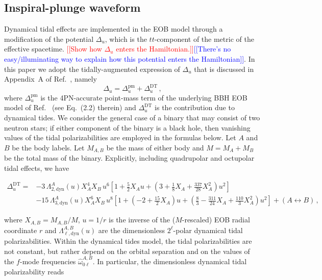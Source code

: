 \documentclass[prd,aps,letter,twocolumn,floatfix,notitlepage,nofootinbib]{revtex4-1}
\newcommand{\red}[1]{\textcolor{red}{#1}}
\newcommand{\blue}[1]{\textcolor{blue}{#1}}
\begin{document}
\subsection{Inspiral-plunge waveform}

Dynamical tidal effects are implemented in the EOB model through a modification of the potential $\Delta_u$, which is the $tt$-component of the metric of the effective spacetime. \red{[[Show how $\Delta_u$ enters the Hamiltonian.]]}\blue{[[There's no easy/illuminating way to explain how this potential enters the Hamiltonian]]}. In this paper we adopt the tidally-augmented expression of $\Delta_u$ that is discussed in Appendix~A of Ref.~\cite{Steinhoff:2016rfi}, namely
\begin{equation}
\Delta_u = \Delta_u^{\textrm{pm}} + \Delta_u^{\textrm{DT}}\,,
\end{equation}
where $\Delta_u^{\textrm{pm}}$ is the 4PN-accurate point-mass term of the underlying BBH EOB model of Ref.~\cite{Bohe:2016gbl} (see Eq.~(2.2) therein) and $\Delta_u^{\textrm{DT}}$ is the contribution due to dynamical tides. We consider the general case of a binary that may consist of two neutron stars; if either component of the binary is a black hole, then vanishing values of the tidal polarizabilities are employed in the formulas below. Let $A$ and $B$ be the body labels. Let $M_{A,B}$ be the mass of either body and $M=M_A+M_B$ be the total mass of the binary.  Explicitly, including quadrupolar and octupolar tidal effects, we have
\begin{widetext}
\begin{align}
 \Delta_u^{\textrm{DT}} =&  - 3\,\Lambda_{2,\textrm{dyn}}^{A}(u)X_A^4 X_B\,u^6  \left[ 1 + \frac{5}{2} X_Au + \left(3 + \frac{1}{8}X_A + \frac{337}{28} X_A^2\right)u^2 \right]\nonumber\\
 &- 15\,\Lambda_{3,\textrm{dyn}}^{A}(u)X_A^6X_B\,u^8 \left[1 + \left(-2 + \frac{15}{2}X_A\right)u + \left(\frac{8}{3} - \frac{311}{24}X_A + \frac{110}{3}X_A^2\right) u^2\right] + (A \leftrightarrow B)\,,
\end{align}
\end{widetext}
where $X_{A,B}=M_{A,B}/M$, $u=1/r$ is the inverse of the ($M$-rescaled) EOB radial coordinate $r$ and $\Lambda_{\ell,\textrm{dyn}}^{A,B}(u)$ are the dimensionless $2^{\ell}$-polar dynamical tidal polarizabilities. Within the dynamical tides model, the tidal polarizabilities are not constant, but rather depend on the orbital separation and on the values of the $f$-mode frequencies $\hat{\omega}_{0\ell}^{A,B}$. In particular, the dimensionless dynamical tidal polarizability reads
\end{document}
